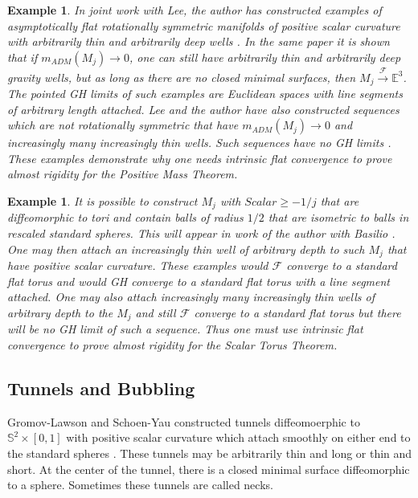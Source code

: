 \documentclass[12pt]{amsart}
\newtheorem{example}[thm]{Example}
\begin{document}
\begin{example} \label{well-mass}
In joint work with Lee, the author
has constructed examples of asymptotically flat
rotationally symmetric manifolds of positive scalar curvature
with arbitrarily thin and arbitrarily deep 
wells  \cite{LeeSormani1}.  In the
same paper it is shown that if $m_{ADM}(M_j) \to 0$, one can still
have arbitrarily thin and arbitrarily deep gravity wells, but as long as
there are no closed minimal surfaces, then $M_j {\stackrel {\mathcal{F}}{\longrightarrow} } {\mathbb{E}}^3$.
The pointed GH limits of such examples are Euclidean spaces with line
segments of arbitrary length attached.
Lee and the author have also constructed sequences which are not
rotationally symmetric that have $m_{ADM}(M_j) \to 0$ and increasingly
many increasingly thin wells.  Such sequences have no GH limits \cite{LeeSormani2}.   These examples demonstrate why one needs
intrinsic flat convergence to prove almost rigidity for the Positive Mass
Theorem.
\end{example}

\begin{example} \label{well-tori}
It is possible to construct $M_j$ with $Scalar \ge -1/j$ that are diffeomorphic
to tori and contain balls of radius $1/2$ that are isometric to 
balls in rescaled standard spheres.  This will appear in work of the
author with Basilio \cite{Basilio-Sormani-1}.
One may then attach an increasingly thin
well of arbitrary depth to such $M_j$ that have positive scalar curvature.
These examples would $\mathcal{F}$ converge to a standard
flat torus and would GH converge to a standard flat torus with 
a line segment attached.  One may also attach increasingly many
increasingly thin wells of arbitrary depth to the $M_j$ and still $\mathcal{F}$ converge to a standard flat torus but there will be no GH limit of such a sequence.
Thus one must use intrinsic flat convergence to prove almost rigidity
for the Scalar Torus Theorem.
\end{example}

\subsection{Tunnels and Bubbling}

Gromov-Lawson and Schoen-Yau constructed tunnels diffeomoerphic
to ${\mathbb{S}}^2 \times [0,1]$ with
positive scalar curvature which attach 
smoothly on either end to the standard spheres \cite{Gromov-Lawson-tunnels}
\cite{Schoen-Yau-tunnels}.  These tunnels may be arbitrarily thin and long
or thin and short.   At the center of the tunnel, there is a closed minimal surface
diffeomorphic to a sphere.  Sometimes these tunnels are called necks.  
\end{document}
